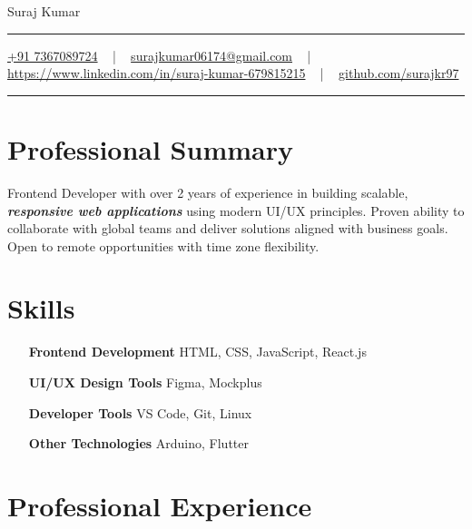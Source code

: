 \documentclass[letterpaper,10pt]{article}
\newcommand{\documentTitle}[2]{
  \begin{center}
    {\Huge\color{accentTitle} #1}
    \vspace{10pt}
    {\color{accentLine} \hrule}
    \vspace{2pt}
    \footnotesize{#2}
    \vspace{2pt}
    {\color{accentLine} \hrule}
  \end{center}
}
\begin{document}
\documentTitle{Suraj Kumar}{
    \href{tel:+917367089724}{
      \raisebox{-0.05\height}{\faPhone} +91 7367089724} ~ | ~
    \href{mailto:surajkumar06174@gmail.com}{
      \raisebox{-0.15\height}{\faEnvelope} surajkumar06174@gmail.com} ~ | ~
    \href{https://linkedin.com/in/suraj-gupta-679815215}{
      \raisebox{-0.15\height}{\faLinkedin} https://www.linkedin.com/in/suraj-kumar-679815215} ~ | ~
    \href{https://github.com/surajkr97}{
      \raisebox{-0.15\height}{\faGithub} github.com/surajkr97}
}

  \section{Professional Summary}
  Frontend Developer with over 2 years of experience in building scalable, \textbf{\textit{responsive web applications}} using modern UI/UX principles. Proven ability to collaborate with global teams and deliver solutions aligned with business goals. Open to remote opportunities with time zone flexibility.


    \section{Skills}

  \begin{multicols}{2}
    \begin{itemize}[itemsep=-2px, parsep=1pt, leftmargin=120pt]
      \item[\textbf{Frontend Development}] HTML, CSS, JavaScript, React.js
      \item[\textbf{UI/UX Design Tools}] Figma, Mockplus
      \item[\textbf{Developer Tools}] VS Code, Git, Linux
      \item[\textbf{Other Technologies}] Arduino, Flutter
    \end{itemize}
  \end{multicols}


  \section{Professional Experience}
\end{document}
